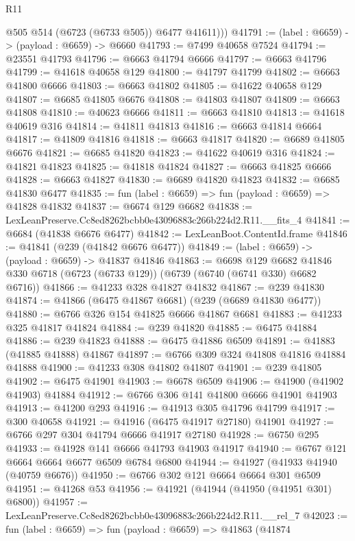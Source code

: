 \begin{lexlean}{R11}
\begin{coremodule}
          @505
          @514
          (@6723 (@6733 @505))
          @6477
          @41611)))
@41791 := (label : @6659) -> (payload : @6659) -> @6660
@41793 := @7499 @40658 @7524
@41794 := @23551 @41793
@41796 := @6663 @41794 @6666
@41797 := @6663 @41796
@41799 := @41618 @40658 @129
@41800 := @41797 @41799
@41802 := @6663 @41800 @6666
@41803 := @6663 @41802
@41805 := @41622 @40658 @129
@41807 := @6685 @41805 @6676
@41808 := @41803 @41807
@41809 := @6663 @41808
@41810 := @40623 @6666
@41811 := @6663 @41810
@41813 := @41618 @40619 @316
@41814 := @41811 @41813
@41816 := @6663 @41814 @6664
@41817 := @41809 @41816
@41818 := @6663 @41817
@41820 := @6689 @41805 @6676
@41821 := @6685 @41820
@41823 := @41622 @40619 @316
@41824 := @41821 @41823
@41825 := @41818 @41824
@41827 := @6663 @41825 @6666
@41828 := @6663 @41827
@41830 := @6689 @41820 @41823
@41832 := @6685 @41830 @6477
@41835 := fun (label : @6659) => fun (payload : @6659) => @41828 @41832
@41837 := @6674 @129 @6682
@41838 := LexLeanPreserve.Cc8ed8262bcbb0e43096883c266b224d2.R11.__fits_4
@41841 := @6684 (@41838 @6676 @6477)
@41842 := LexLeanBoot.ContentId.frame
@41846 := @41841 (@239 (@41842 @6676 @6477))
@41849 := (label : @6659) -> (payload : @6659) -> @41837 @41846
@41863 := @6698
    @129
    @6682
    @41846
    @330
    @6718
    (@6723 (@6733 @129))
    (@6739 (@6740 (@6741 @330) @6682 @6716))
@41866 := @41233 @328 @41827 @41832
@41867 := @239 @41830
@41874 := @41866 (@6475 @41867 @6681) (@239 (@6689 @41830 @6477))
@41880 := @6766 @326 @154 @41825 @6666 @41867 @6681
@41883 := @41233 @325 @41817 @41824
@41884 := @239 @41820
@41885 := @6475 @41884
@41886 := @239 @41823
@41888 := @6475 @41886 @6509
@41891 := @41883 (@41885 @41888) @41867
@41897 := @6766 @309 @324 @41808 @41816 @41884 @41888
@41900 := @41233 @308 @41802 @41807
@41901 := @239 @41805
@41902 := @6475 @41901
@41903 := @6678 @6509
@41906 := @41900 (@41902 @41903) @41884
@41912 := @6766 @306 @141 @41800 @6666 @41901 @41903
@41913 := @41200 @293
@41916 := @41913 @305 @41796 @41799
@41917 := @300 @40658
@41921 := @41916 (@6475 @41917 @27180) @41901
@41927 := @6766 @297 @304 @41794 @6666 @41917 @27180
@41928 := @6750 @295
@41933 := @41928 @141 @6666 @41793 @41903 @41917
@41940 := @6767 @121 @6664 @6664 @6677 @6509 @6784 @6800
@41944 := @41927 (@41933 @41940 (@40759 @6676))
@41950 := @6766 @302 @121 @6664 @6664 @301 @6509
@41951 := @41268 @53
@41956 := @41921 (@41944 (@41950 (@41951 @301) @6800))
@41957 := LexLeanPreserve.Cc8ed8262bcbb0e43096883c266b224d2.R11.__rel_7
@42023 := fun (label : @6659) =>
  fun (payload : @6659) =>
  @41863
    (@41874

\end{coremodule}
\end{lexlean}
